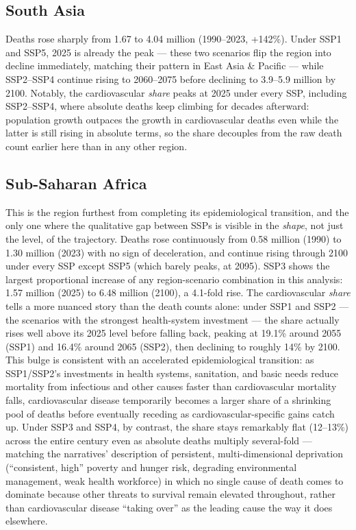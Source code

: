 \subsection*{South Asia}
Deaths rose sharply from 1.67 to 4.04 million (1990--2023, +142\%). Under SSP1 and SSP5, 2025 is already the peak — these two scenarios flip the region into decline immediately, matching their pattern in East Asia \& Pacific — while SSP2--SSP4 continue rising to 2060--2075 before declining to 3.9--5.9 million by 2100. Notably, the cardiovascular \emph{share} peaks at 2025 under every SSP, including SSP2--SSP4, where absolute deaths keep climbing for decades afterward: population growth outpaces the growth in cardiovascular deaths even while the latter is still rising in absolute terms, so the share decouples from the raw death count earlier here than in any other region.

\subsection*{Sub-Saharan Africa}
This is the region furthest from completing its epidemiological transition, and the only one where the qualitative gap between SSPs is visible in the \emph{shape}, not just the level, of the trajectory. Deaths rose continuously from 0.58 million (1990) to 1.30 million (2023) with no sign of deceleration, and continue rising through 2100 under every SSP except SSP5 (which barely peaks, at 2095). SSP3 shows the largest proportional increase of any region-scenario combination in this analysis: 1.57 million (2025) to 6.48 million (2100), a 4.1-fold rise. The cardiovascular \emph{share} tells a more nuanced story than the death counts alone: under SSP1 and SSP2 — the scenarios with the strongest health-system investment — the share actually rises well above its 2025 level before falling back, peaking at 19.1\% around 2055 (SSP1) and 16.4\% around 2065 (SSP2), then declining to roughly 14\% by 2100. This bulge is consistent with an accelerated epidemiological transition: as SSP1/SSP2's investments in health systems, sanitation, and basic needs reduce mortality from infectious and other causes faster than cardiovascular mortality falls, cardiovascular disease temporarily becomes a larger share of a shrinking pool of deaths before eventually receding as cardiovascular-specific gains catch up. Under SSP3 and SSP4, by contrast, the share stays remarkably flat (12--13\%) across the entire century even as absolute deaths multiply several-fold — matching the narratives' description of persistent, multi-dimensional deprivation (``consistent, high'' poverty and hunger risk, degrading environmental management, weak health workforce) in which no single cause of death comes to dominate because other threats to survival remain elevated throughout, rather than cardiovascular disease ``taking over'' as the leading cause the way it does elsewhere.

